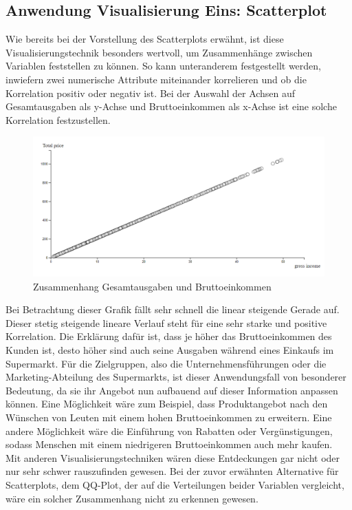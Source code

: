 \documentclass[usegeometry=true]{scrartcl}
\begin{document}
\subsection{Anwendung Visualisierung Eins: Scatterplot}
Wie bereits bei der Vorstellung des Scatterplots erwähnt, ist diese Visualisierungstechnik besonders wertvoll, um Zusammenhänge zwischen Variablen feststellen zu können. So kann
unteranderem festgestellt werden, inwiefern zwei numerische Attribute miteinander korrelieren und ob die Korrelation positiv oder negativ ist. Bei der Auswahl der Achsen auf
Gesamtausgaben als y-Achse und Bruttoeinkommen als x-Achse ist eine solche Korrelation festzustellen.
\begin{figure} [H]
	\begin{center}
		\includegraphics[width=15cm]{IMG/TotalPrice_GrossIncome.png}
		\caption{Zusammenhang Gesamtausgaben und Bruttoeinkommen}
		\label{fig:TotalPrice_Income}
	\end{center}
\end{figure}
\noindent Bei Betrachtung dieser Grafik fällt sehr schnell die linear steigende Gerade auf. Dieser stetig steigende lineare Verlauf steht für eine sehr starke und positive
Korrelation. Die Erklärung dafür ist, dass je höher das Bruttoeinkommen des Kunden ist, desto höher sind auch seine Ausgaben während eines Einkaufs im Supermarkt. Für die
Zielgruppen, also die Unternehmensführungen oder die Marketing-Abteilung des Supermarkts, ist dieser Anwendungsfall von besonderer Bedeutung, da sie ihr Angebot nun aufbauend
auf dieser Information anpassen können. Eine Möglichkeit wäre zum Beispiel, dass Produktangebot nach den Wünschen von Leuten mit einem hohen Bruttoeinkommen zu erweitern.
Eine andere Möglichkeit wäre die Einführung von Rabatten oder Vergünstigungen, sodass Menschen mit einem niedrigeren Bruttoeinkommen auch mehr kaufen. \\
\noindent Mit anderen Visualisierungstechniken wären diese Entdeckungen gar nicht oder nur sehr schwer rauszufinden gewesen. Bei der zuvor erwähnten Alternative für Scatterplots,
dem QQ-Plot, der auf die Verteilungen beider Variablen vergleicht, wäre ein solcher Zusammenhang nicht zu erkennen gewesen.
\end{document}
